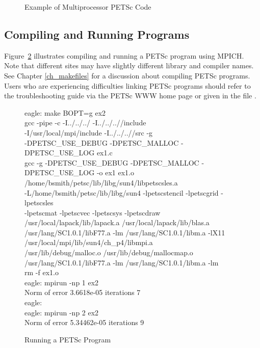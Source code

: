 \begin{figure}[H]
{\footnotesize
{}
}
\nobreak
\caption{Example of Multiprocessor PETSc Code}
\label{fig_example2}
\end{figure}

\subsection*{Compiling and Running Programs}

Figure~\ref{fig_exrun} illustrates compiling and running a PETSc program
using MPICH.  Note that different sites may have slightly different
library and compiler names.  See Chapter \ref{ch_makefiles}
for a discussion about compiling PETSc programs.
Users who are experiencing difficulties linking PETSc programs should 
refer to the troubleshooting guide via the PETSc WWW home page 
 or
given in the file .

\begin{figure}[H]
{\small
\begin{tabbing}
   eagle: make BOPT=g ex2\\
   gcc  -pipe -c  -I../../../  -I../../..//include   \\
       -I/usr/local/mpi/include  -I../../..//src -g \\
       -DPETSC\_USE\_DEBUG -DPETSC\_MALLOC -DPETSC\_USE\_LOG ex1.c\\
   gcc -g -DPETSC\_USE\_DEBUG -DPETSC\_MALLOC -DPETSC\_USE\_LOG -o ex1 ex1.o \\
      /home/bsmith/petsc/lib/libg/sun4/libpetscsles.a \\
      -L/home/bsmith/petsc/lib/libg/sun4 -lpetscstencil -lpetscgrid  -lpetscsles \\
      -lpetscmat  -lpetscvec -lpetscsys -lpetscdraw  \\
      /usr/local/lapack/lib/lapack.a /usr/local/lapack/lib/blas.a \\
      /usr/lang/SC1.0.1/libF77.a -lm /usr/lang/SC1.0.1/libm.a -lX11 \\
      /usr/local/mpi/lib/sun4/ch\_p4/libmpi.a\\
      /usr/lib/debug/malloc.o /usr/lib/debug/mallocmap.o  \\
      /usr/lang/SC1.0.1/libF77.a -lm /usr/lang/SC1.0.1/libm.a -lm\\
   rm -f ex1.o\\
   eagle: mpirun -np 1 ex2\\
   Norm of error 3.6618e-05 iterations 7\\
   eagle:\\
   eagle: mpirun -np 2 ex2\\
   Norm of error 5.34462e-05 iterations 9
\end{tabbing}
}
\nobreak
\caption{Running a PETSc Program}
\label{fig_exrun}
\end{figure}

